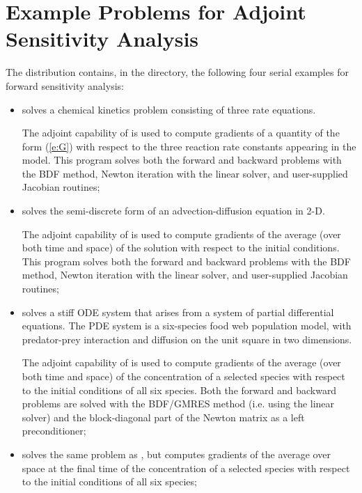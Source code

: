 \section{Example Problems for Adjoint Sensitivity Analysis}\label{s:adj_examples}

The {\cvodes} distribution contains, in the 
directory, the following four serial examples for forward sensitivity analysis:

\begin{itemize}
\item {}
  solves a chemical kinetics problem consisting of three rate equations.
  
  The adjoint capability of {\cvodes} is used to compute gradients
  of a quantity of the form (\ref{e:G}) with respect to the three
  reaction rate constants appearing in the model.
  This program solves both the forward and backward problems with the BDF method, 
  Newton iteration with the {\cvdense} linear solver, and user-supplied    
  Jacobian routines;
\item {}
  solves the semi-discrete form of an advection-diffusion equation in 2-D.

  The adjoint capability of {\cvodes} is used to compute gradients
  of the average (over both time and space) of the solution with respect to
  the initial conditions.
  This program solves both the forward and backward problems with the BDF method, 
  Newton iteration with the {\cvband} linear solver, and user-supplied     
  Jacobian routines;
\item {}
  solves a stiff ODE system that arises from a system     
  of partial differential equations.  The PDE system is a six-species
  food web population model, with predator-prey interaction and diffusion 
  on the unit square in two dimensions.

  The adjoint capability of {\cvodes} is used to compute gradients
  of the average (over both time and space) of the concentration of a selected species
  with respect to the initial conditions of all six species.
  Both the forward and backward problems are solved with the BDF/GMRES method 
  (i.e. using the {\cvspgmr} linear solver) and the block-diagonal part of the  
  Newton matrix as a left preconditioner;
\item {}
  solves the same problem as , but computes gradients
  of the average over space at the final time of the concentration of a selected species
  with respect to the initial conditions of all six species;
\end{itemize}

